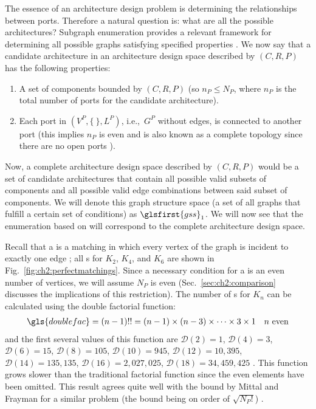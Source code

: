 The essence of an architecture design problem is determining the relationships between ports. Therefore a natural question is: what are all the possible architectures? Subgraph enumeration provides a relevant framework for determining all possible graphs satisfying specified properties \cite{Rispoli2007a}. We now say that a candidate architecture in an architecture design space described by $(C,R,P)$ has the following properties:
\begin{enumerate}[nosep]
\item A set of components bounded by $(C,R,P)$ (so $n_P \leq N_P$, where $n_P$ is the total number of ports for the candidate architecture).
\item Each port in $(V^P, \{\ \}, L^P )$, i.e.,~$G^P$ without edges, is connected to another port (this implies $n_P$ is even and is also known as a complete topology since there are no open ports \cite{Snavely1993a}).
\end{enumerate}

\noindent Now, a complete architecture design space described by $(C,R,P)$ would be a set of candidate architectures that contain all possible valid subsets of components and all possible valid edge combinations between said subset of components. We will denote this graph structure space (a set of all graphs that fulfill a certain set of conditions) as $\glsfirst{gss}_1$. We will now see that the enumeration based on  will correspond to the complete architecture design space.

Recall that a \mypm{} is a matching in which every vertex of the graph is incident to exactly one edge \cite{Rispoli2007a}; all \mypm{}s for $K_2$, $K_4$, and $K_6$ are shown in Fig.~\ref{fig:ch2:perfectmatchings}. Since a necessary condition for a \mypm{} is an even number of vertices, we will assume $N_P$ is even (Sec.~\ref{sec:ch2:comparison} discusses the implications of this restriction).  The number of \mypm{}s for $K_{n}$ can be calculated using the double factorial function:
\begin{align}
\gls{doublefac} = (n-1)!! = (n-1) \times (n - 3) \times \dots \times 3 \times 1 \quad n \text{ even}
\end{align}
\noindent and the first several values of this function are $\mathcal{D}(2) = 1$, $\mathcal{D}(4) = 3$, $\mathcal{D}(6) = 15$, $\mathcal{D}(8) = 105$, $\mathcal{D}(10) = 945$, $\mathcal{D}(12) = 10,395$,  $\mathcal{D}(14) = 135,135$, $\mathcal{D}(16) = 2,027,025$, $\mathcal{D}(18) = 34,459,425$ \cite{OEISA001147}. This function grows slower than the traditional factorial function since the even elements have been omitted. This result agrees quite well with the bound by Mittal and Frayman for a similar problem (the bound being on order of $\sqrt{N_P!}$) \cite{Mittal1989a}.

